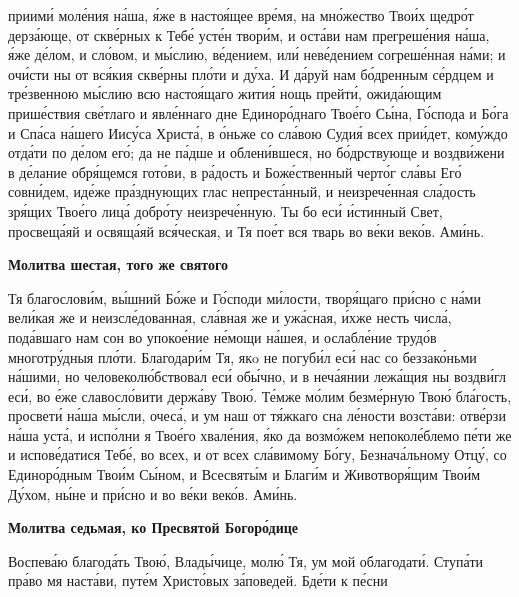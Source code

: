 приими́ моле́ния на́ша, я́же в настоя́щее вре́мя, на мно́жество Твои́х щедро́т
дерза́юще, от скве́рных к Тебе́ усте́н твори́м, и оста́ви нам прегреше́ния
на́ша, я́же де́лом, и сло́вом, и мы́слию, ве́дением, или́ неве́дением
согреше́нная на́ми; и очи́сти ны от вся́кия скве́рны пло́ти и ду́ха. И да́руй
нам бо́дренным се́рдцем и тре́звенною мы́слию всю настоя́щаго жития́ нощь
прейти́, ожида́ющим прише́ствия све́тлаго и явле́ннаго дне Единоро́днаго
Твое́го Сы́на, Го́спода и Бо́га и Спа́са на́шего Иису́са Христа́, в о́ньже
со сла́вою Судия́ всех прии́дет, кому́ждо отда́ти по де́лом его́; да
не па́дше и облени́вшеся, но бо́дрствующе и воздви́жени в де́лание
обря́щемся гото́ви, в ра́дость и Боже́ственный черто́г сла́вы Его́ совни́дем,
иде́же пра́зднующих глас непреста́нный, и неизрече́нная сла́дость
зря́щих Твое́го лица́ добро́ту неизрече́нную. Ты бо еси́ и́стинный Свет,
просвеща́яй и освяща́яй вся́ческая, и Тя пое́т вся тварь во ве́ки веко́в.
Ами́нь.



 

\bfseries Молитва шестая, того же святого\normalfont{}


   Тя благослови́м, вы́шний Бо́же и Го́споди ми́лости, творя́щаго
при́сно с на́ми вели́кая же и неизсле́дованная, сла́вная же и ужа́сная,
и́хже несть числа́, пода́вшаго нам сон во упокое́ние не́мощи на́шея,
и ослабле́ние трудо́в многотру́дныя пло́ти. Благодари́м Тя, якo не
погуби́л еси́ нас со беззако́ньми на́шими, но человеколю́бствовал еси́
обы́чно, и в неча́янии лежа́щия ны воздви́гл еси́, во е́же славосло́вити
держа́ву Твою́. Те́мже мо́лим безме́рную Твою́ бла́гость, просвети́ на́ша
мы́сли, очеса́, и ум наш от тя́жкаго сна ле́ности возста́ви: отве́рзи на́ша
уста́, и испо́лни я Твое́го хвале́ния, я́ко да возмо́жем непоколе́блемо
пе́ти же и испове́датися Тебе́, во всех, и от всех сла́вимому Бо́гу,
Безнача́льному Отцу́, со Единоро́дным Твои́м Сы́ном, и Всесвяты́м и
Благи́м и Животворя́щим Твои́м Ду́хом, ны́не и при́сно и во ве́ки веко́в.
Ами́нь.



 

\bfseries Молитва седьмая, ко Пресвятой Богоро́дице\normalfont{}


   Воспева́ю благода́ть Твою́, Влады́чице, молю́ Тя, ум мой облагодати́.
Ступа́ти пра́во мя наста́ви, путе́м Христо́вых за́поведей. Бде́ти к пе́сни

